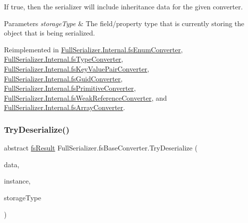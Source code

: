If true, then the serializer will include inheritance data for the given converter. 


\begin{DoxyParams}{Parameters}
{\em storage\+Type} & The field/property type that is currently storing the object that is being serialized.\\
\hline
\end{DoxyParams}


Reimplemented in \hyperlink{class_full_serializer_1_1_internal_1_1fs_enum_converter_a4af727f1cb13c61c7e5f57bb6c3e682b}{Full\+Serializer.\+Internal.\+fs\+Enum\+Converter}, \hyperlink{class_full_serializer_1_1_internal_1_1fs_type_converter_a3f4750a4e8a6a6ae582c73cf5d8142e5}{Full\+Serializer.\+Internal.\+fs\+Type\+Converter}, \hyperlink{class_full_serializer_1_1_internal_1_1fs_key_value_pair_converter_af20b5573e313464e13c17735746a2267}{Full\+Serializer.\+Internal.\+fs\+Key\+Value\+Pair\+Converter}, \hyperlink{class_full_serializer_1_1_internal_1_1fs_guid_converter_a4556062bfaec5d51b7c1120bf1388a4c}{Full\+Serializer.\+Internal.\+fs\+Guid\+Converter}, \hyperlink{class_full_serializer_1_1_internal_1_1fs_primitive_converter_a96bfa5776105d8d9fffb1fd01c53af2e}{Full\+Serializer.\+Internal.\+fs\+Primitive\+Converter}, \hyperlink{class_full_serializer_1_1_internal_1_1fs_weak_reference_converter_a4f8dd86c002f7a3e6b25a1b16d791c60}{Full\+Serializer.\+Internal.\+fs\+Weak\+Reference\+Converter}, and \hyperlink{class_full_serializer_1_1_internal_1_1fs_array_converter_a0c8625b10aee6ed789981e1f14c09ca1}{Full\+Serializer.\+Internal.\+fs\+Array\+Converter}.

\mbox{\label{class_full_serializer_1_1fs_base_converter_a38d3d1b042eb788819883354073a224e}} 
\subsubsection{\texorpdfstring{Try\+Deserialize()}{TryDeserialize()}}
{\footnotesize\ttfamily abstract \hyperlink{struct_full_serializer_1_1fs_result}{fs\+Result} Full\+Serializer.\+fs\+Base\+Converter.\+Try\+Deserialize (\begin{DoxyParamCaption}\item[{\hyperlink{class_full_serializer_1_1fs_data}{fs\+Data}}]{data,  }\item[{ref object}]{instance,  }\item[{Type}]{storage\+Type }\end{DoxyParamCaption})\hspace{0.3cm}{\ttfamily [pure virtual]}}



